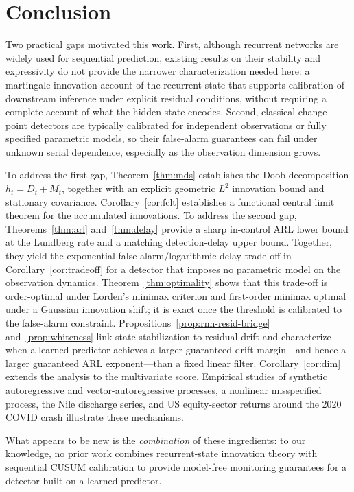 \documentclass[bj,authoryear]{imsart}
\theoremstyle{plain}
\theoremstyle{definition}
\begin{document}
\section{Conclusion}
\label{sec:conclusion}
Two practical gaps motivated this work. First, although recurrent networks are widely used for sequential prediction, existing results on their stability and expressivity do not provide the narrower characterization needed here: a martingale-innovation account of the recurrent state that supports calibration of downstream inference under explicit residual conditions, without requiring a complete account of what the hidden state encodes. Second, classical change-point detectors are typically calibrated for independent observations or fully specified parametric models, so their false-alarm guarantees can fail under unknown serial dependence, especially as the observation dimension grows.

To address the first gap, Theorem~\ref{thm:mds} establishes the Doob decomposition
$h_t=D_t+M_t$, together with an explicit geometric $L^2$ innovation bound and
stationary covariance. Corollary~\ref{cor:fclt} establishes a functional central
limit theorem for the accumulated innovations.
%
To address the second gap, Theorems~\ref{thm:arl} and~\ref{thm:delay} provide a
sharp in-control ARL lower bound at the Lundberg rate and a matching
detection-delay upper bound. Together, they yield the
exponential-false-alarm/logarithmic-delay trade-off in
Corollary~\ref{cor:tradeoff} for a detector that imposes no parametric model on
the observation dynamics. Theorem~\ref{thm:optimality} shows that this trade-off
is order-optimal under Lorden's minimax criterion and first-order minimax
optimal under a Gaussian innovation shift; it is exact once the threshold is
calibrated to the false-alarm constraint.
%
Propositions~\ref{prop:rnn-resid-bridge} and~\ref{prop:whiteness} link state
stabilization to residual drift and characterize when a learned predictor
achieves a larger guaranteed drift margin---and hence a larger guaranteed ARL
exponent---than a fixed linear filter. Corollary~\ref{cor:dim} extends the
analysis to the multivariate score. Empirical studies of synthetic
autoregressive and vector-autoregressive processes, a nonlinear misspecified
process, the Nile discharge series, and US equity-sector returns around the
2020 COVID crash illustrate these mechanisms.


What appears to be new is the \emph{combination} of these ingredients: to our knowledge, no prior work combines recurrent-state innovation theory with sequential CUSUM calibration to provide model-free monitoring guarantees for a detector built on a learned predictor.
\end{document}
